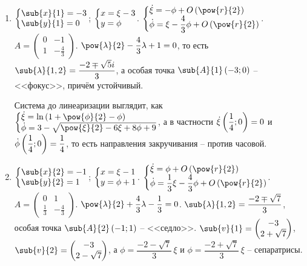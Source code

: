 \documentclass[a5paper,10pt]{article}
\begin{document}
\begin{enumerate}
    \item $\tsys{\sub{x}{1} = -3 \\ \sub{y}{1} = 0}$; $\tsys{x = \xi - 3 \\ y = \phi}$.
    $\tsys{
        \dot{\xi} = -\phi + O\br{\pow{r}{2}} 
        \\ \dot{\phi} = \xi - \dfrac {4} {3} \phi + O\br{\pow{r}{2}}
    }$. \\
    $A = \begin{pmatrix} 0 &  -1 \\ 1 & -\frac {4} {3} \end{pmatrix}$.
    $\pow{\lambda}{2} - \dfrac {4} {3} \lambda + 1 = 0$, то есть
    $\sub{\lambda}{1, 2} = \dfrac {-2 \mp \sqrt{5}i} {3}$,
    а особая точка $\sub{A}{1}\br{-3; 0}$ -- <<фокус>>, причём устойчивый.
    
    Система до линеаризации выглядит, как
    $\tsys{
        \dot{\xi} = \ln\br{1 + \pow{\phi}{2} - \phi} 
        \\ \dot{\phi} = 3 - \sqrt{\pow{\xi}{2} - 6\xi + 8\phi + 9}
    }$, а в частности
    $\dot{\xi}\left(\hspace{0.01em}\dfrac {1} {4}; 0\hspace{0.01em}\right) = 0$ и 
    $\dot{\phi}\left(\hspace{0.01em}\dfrac {1} {4}; 0\hspace{0.01em}\right) = \dfrac {1} {4}$,
    то есть направления закручивания -- против часовой.
    
    \item $\tsys{\sub{x}{2} = -1 \\ \sub{y}{2} = 1}$;
    $\tsys{x = \xi - 1 \\ y = \phi + 1}$.
    $\tsys{
        \dot{\xi} = \phi + O\br{\pow{r}{2}} 
        \\ \dot{\phi} = \dfrac {1} {3} \xi - \dfrac {4} {3} \phi + O\br{\pow{r}{2}}
    }$. \\
    $A = \begin{pmatrix} 0 &  1 \\ \frac {1} {3} & -\frac {4} {3} \end{pmatrix}$.
    $\pow{\lambda}{2} + \dfrac {4} {3} \lambda - \dfrac {1} {3} = 0$.
    $\sub{\lambda}{1, 2} = \dfrac {-2 \mp \sqrt{7}} {3}$,
    особая точка $\sub{A}{2}\br{-1; 1}$ -- <<седло>>.
    $\sub{v}{1} = \begin{pmatrix} -3 \\ 2 + \sqrt{7}\end{pmatrix}$,
    $\sub{v}{2} = \begin{pmatrix} -3 \\ 2 - \sqrt{7}\end{pmatrix}$, 
    а $\phi = \dfrac {-2 -\sqrt{7}} {3}\, \xi$
    и $\phi = \dfrac {-2 +\sqrt{7}} {3}\, \xi$ -- сепаратрисы.
    

\end{enumerate}
\end{document}
